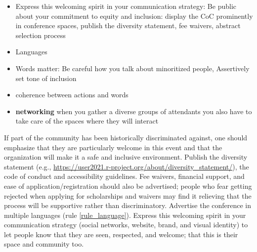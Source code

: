 \documentclass[10pt,letterpaper]{article}
\begin{document}
\begin{itemize}
    \item Express this welcoming spirit in your communication strategy: Be public about your commitment to equity and inclusion: display the CoC prominently in conference spaces, publish the diversity statement, fee waivers, abstract selection process
    \item Languages
    \item Words matter: Be careful how you talk about minoritized people, Assertively set tone of inclusion
    \item coherence between actions and words
    \item \textbf{networking} when you gather a diverse groups of attendants you also have to take care of the spaces where they will interact
\end{itemize}

If part of the community has been historically discriminated against, one should emphasize that they are particularly welcome in this event and that the organization will make it a safe and inclusive environment. Publish the diversity statement (e.g., \url{https://user2021.r-project.org/about/diversity_statement/}), the code of conduct and accessibility guidelines. Fee waivers, financial support, and ease of application/registration should also be advertised; people who fear getting rejected when applying for scholarships and waivers may find it relieving that the process will be supportive rather than discriminatory. Advertise the conference in multiple languages (rule \ref{rule_language}). Express this welcoming spirit in your communication strategy (social networks, website, brand, and visual identity) to let people know that they are seen, respected, and welcome; that this is their space and community too. 

\end{document}
